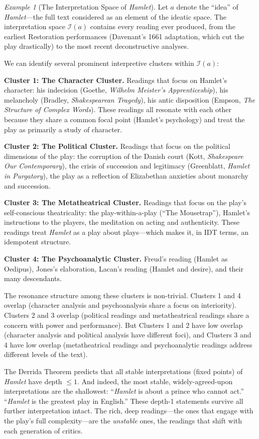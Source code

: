 \documentclass[11pt,openany]{book}
\theoremstyle{definition}
\theoremstyle{plain}
\theoremstyle{remark}
\newtheorem{example}[axiom]{Example}
\begin{document}
\begin{example}[The Interpretation Space of \emph{Hamlet}]
Let $a$ denote the ``idea'' of \emph{Hamlet}---the full text considered as an element of the ideatic space. The interpretation space $\mathcal{I}(a)$ contains every reading ever produced, from the earliest Restoration performances (Davenant's 1661 adaptation, which cut the play drastically) to the most recent deconstructive analyses.

We can identify several prominent interpretive clusters within $\mathcal{I}(a)$:

\textbf{Cluster 1: The Character Cluster.} Readings that focus on Hamlet's character: his indecision (Goethe, \emph{Wilhelm Meister's Apprenticeship}), his melancholy (Bradley, \emph{Shakespearean Tragedy}), his antic disposition (Empson, \emph{The Structure of Complex Words}). These readings all resonate with each other because they share a common focal point (Hamlet's psychology) and treat the play as primarily a study of character.

\textbf{Cluster 2: The Political Cluster.} Readings that focus on the political dimensions of the play: the corruption of the Danish court (Kott, \emph{Shakespeare Our Contemporary}), the crisis of succession and legitimacy (Greenblatt, \emph{Hamlet in Purgatory}), the play as a reflection of Elizabethan anxieties about monarchy and succession.

\textbf{Cluster 3: The Metatheatrical Cluster.} Readings that focus on the play's self-conscious theatricality: the play-within-a-play (``The Mousetrap''), Hamlet's instructions to the players, the meditation on acting and authenticity. These readings treat \emph{Hamlet} as a play about plays---which makes it, in IDT terms, an idempotent structure.

\textbf{Cluster 4: The Psychoanalytic Cluster.} Freud's reading (Hamlet as Oedipus), Jones's elaboration, Lacan's reading (Hamlet and desire), and their many descendants.

The resonance structure among these clusters is non-trivial. Clusters 1 and 4 overlap (character analysis and psychoanalysis share a focus on interiority). Clusters 2 and 3 overlap (political readings and metatheatrical readings share a concern with power and performance). But Clusters 1 and 2 have low overlap (character analysis and political analysis have different foci), and Clusters 3 and 4 have low overlap (metatheatrical readings and psychoanalytic readings address different levels of the text).

The Derrida Theorem predicts that all stable interpretations (fixed points) of \emph{Hamlet} have depth $\leq 1$. And indeed, the most stable, widely-agreed-upon interpretations are the shallowest: ``\emph{Hamlet} is about a prince who cannot act.'' ``\emph{Hamlet} is the greatest play in English.'' These depth-1 statements survive all further interpretation intact. The rich, deep readings---the ones that engage with the play's full complexity---are the \emph{unstable} ones, the readings that shift with each generation of critics.
\end{example}
\end{document}
